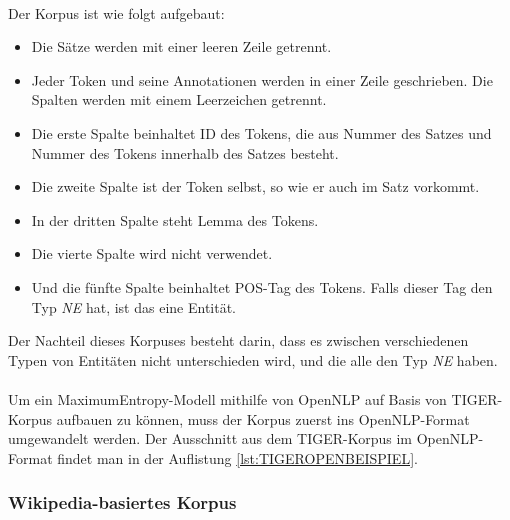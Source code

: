 

\paragraph{}
Der Korpus ist wie folgt aufgebaut:
\begin{itemize}
\item Die Sätze werden mit einer leeren Zeile getrennt.
\item Jeder Token und seine Annotationen werden in einer Zeile geschrieben. Die Spalten werden mit einem Leerzeichen getrennt.
\item Die erste Spalte beinhaltet ID des Tokens, die aus Nummer des Satzes und Nummer des Tokens innerhalb des Satzes besteht.
\item Die zweite Spalte ist der Token selbst, so wie er auch im Satz vorkommt.
\item In der dritten Spalte steht Lemma des Tokens.
\item Die vierte Spalte wird nicht verwendet.
\item Und die fünfte Spalte beinhaltet POS-Tag des Tokens. Falls dieser Tag den Typ \textit{NE} hat, ist das eine Entität.
\end{itemize}

Der Nachteil dieses Korpuses besteht darin, dass es zwischen verschiedenen Typen von Entitäten nicht unterschieden wird, und die alle den Typ \textit{NE} haben.

\paragraph{}
Um ein MaximumEntropy-Modell mithilfe von OpenNLP auf Basis von TIGER-Korpus aufbauen zu können, muss der Korpus zuerst ins OpenNLP-Format umgewandelt werden. Der Ausschnitt aus dem TIGER-Korpus im OpenNLP-Format findet man in der Auflistung \ref{lst:TIGEROPENBEISPIEL}.



\subsubsection{Wikipedia-basiertes Korpus}
